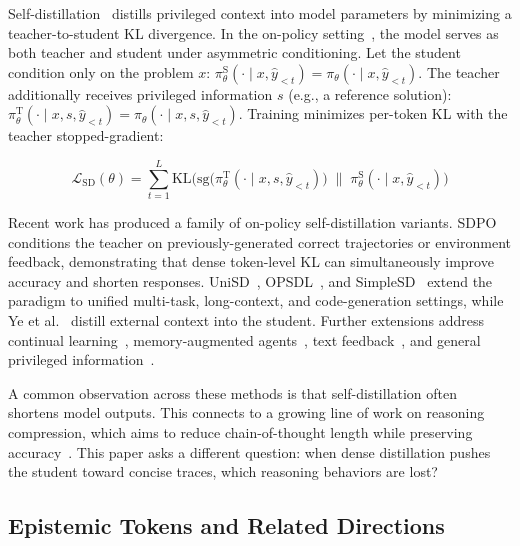 \documentclass[11pt]{article}
\begin{document}
Self-distillation~\cite{snell2022learning} distills privileged context into model parameters by minimizing a teacher-to-student KL divergence.
In the on-policy setting~\cite{agarwal2024onpolicy}, the model serves as both teacher and student under asymmetric conditioning.
Let the student condition only on the problem $x$: $\pi_\theta^{\text{S}}(\cdot \mid x, \hat{y}_{<t}) = \pi_\theta(\cdot \mid x, \hat{y}_{<t})$.
The teacher additionally receives privileged information $s$ (e.g., a reference solution):
$\pi_\theta^{\text{T}}(\cdot \mid x, s, \hat{y}_{<t}) = \pi_\theta(\cdot \mid x, s, \hat{y}_{<t})$.
Training minimizes per-token KL with the teacher stopped-gradient:

{\small
\begin{equation}
    \mathcal{L}_{\text{SD}}(\theta) = \sum_{t=1}^{L} \text{KL}\bigl(
        \text{sg}\bigl(\pi_\theta^{\text{T}}(\cdot \mid x, s, \hat{y}_{<t})\bigr)
        \;\|\;
        \pi_\theta^{\text{S}}(\cdot \mid x, \hat{y}_{<t})
    \bigr)
\label{eq:sd_loss}
\end{equation}}

Recent work has produced a family of on-policy self-distillation variants.
SDPO~\cite{hubotter2026reinforcement} conditions the teacher on previously-generated correct trajectories or environment feedback, demonstrating that dense token-level KL can simultaneously improve accuracy and shorten responses.
UniSD~\cite{jin2026unisd}, OPSDL~\cite{zhang2026opsdl}, and SimpleSD~\cite{zhang2026simple} extend the paradigm to unified multi-task, long-context, and code-generation settings, while Ye et al.~\cite{ye2026onpolicy} distill external context into the student.
Further extensions address continual learning~\cite{shenfeld2026self}, memory-augmented agents~\cite{liu2026exploratory}, text feedback~\cite{song2026expanding}, and general privileged information~\cite{penaloza2026privileged}.

A common observation across these methods is that self-distillation often shortens model outputs.
This connects to a growing line of work on reasoning compression, which aims to reduce chain-of-thought length while preserving accuracy~{\cite{shrivastava2025sample,sang2026onpolicy,deng2026conpress,yang2026accordion,luo2026compress}}.
This paper asks a different question: when dense distillation pushes the student toward concise traces, which reasoning behaviors are lost?
\subsection{Epistemic Tokens and Related Directions}
\end{document}

